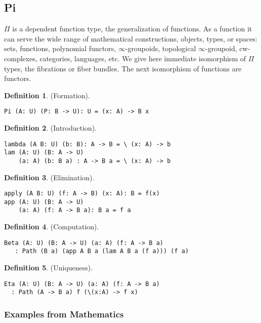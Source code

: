 \documentclass{article}
\theoremstyle{definition}
\newtheorem{definition}{Definition}
\begin{document}
\subsection{Pi}

$\Pi$ is a dependent function type, the generalization of functions.
As a function it can serve the wide range of mathematical constructions,
objects, types, or spaces: sets, functions, polynomial functors, $\infty$-groupoids,
topological $\infty$-groupoid, cw-complexes,
categories, languages, etc. We give here immediate  isomorphism of $\Pi$ types,
the fibrations or fiber bundles. The next isomorphism of functions are functors.

\begin{definition} (Formation).
\begin{lstlisting}
Pi (A: U) (P: B -> U): U = (x: A) -> B x
\end{lstlisting}
\end{definition}

\begin{definition} (Introduction).
\begin{lstlisting}
lambda (A B: U) (b: B): A -> B = \ (x: A) -> b
lam (A: U) (B: A -> U)
    (a: A) (b: B a) : A -> B a = \ (x: A) -> b
\end{lstlisting}
\end{definition}

\begin{definition} (Elimination).
\begin{lstlisting}
apply (A B: U) (f: A -> B) (x: A): B = f(x)
app (A: U) (B: A -> U)
    (a: A) (f: A -> B a): B a = f a
\end{lstlisting}
\end{definition}

\begin{definition} (Computation).
\begin{lstlisting}
Beta (A: U) (B: A -> U) (a: A) (f: A -> B a)
   : Path (B a) (app A B a (lam A B a (f a))) (f a)
\end{lstlisting}
\end{definition}

\begin{definition} (Uniqueness).
\begin{lstlisting}
Eta (A: U) (B: A -> U) (a: A) (f: A -> B a)
  : Path (A -> B a) f (\(x:A) -> f x)
\end{lstlisting}
\end{definition}

\subsubsection*{Examples from Mathematics}
\end{document}

